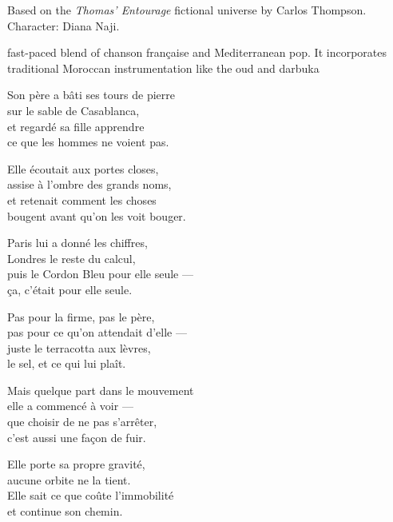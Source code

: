 

\begin{notes}
Based on the \emph{Thomas’ Entourage} fictional universe by Carlos Thompson.\\
Character: Diana Naji.\\
\end{notes}

\begin{style}
fast-paced blend of chanson française and Mediterranean pop. %
It incorporates traditional Moroccan instrumentation like the oud and darbuka
\end{style}

\begin{lyrics}

Son père a bâti ses tours de pierre\\
sur le sable de Casablanca,\\
et regardé sa fille apprendre\\
ce que les hommes ne voient pas.

Elle écoutait aux portes closes,\\
assise à l'ombre des grands noms,\\
et retenait comment les choses\\
bougent avant qu'on les voit bouger.

Paris lui a donné les chiffres,\\
Londres le reste du calcul,\\
puis le Cordon Bleu pour elle seule —\\
ça, c'était pour elle seule.

Pas pour la firme, pas le père,\\
pas pour ce qu'on attendait d'elle —\\
juste le terracotta aux lèvres,\\
le sel, et ce qui lui plaît.

Mais quelque part dans le mouvement\\
elle a commencé à voir —\\
que choisir de ne pas s'arrêter,\\
c'est aussi une façon de fuir.


Elle porte sa propre gravité,\\
aucune orbite ne la tient.\\
Elle sait ce que coûte l'immobilité\\
et continue son chemin.


\end{lyrics}
